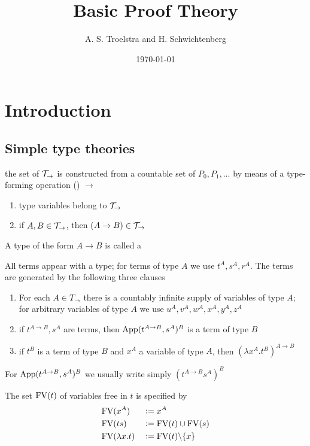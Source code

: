 \documentclass[11pt]{article}
\author{A. S. Troelstra and H. Schwichtenberg}
\date{\today}
\title{Basic Proof Theory}
\begin{document}
\maketitle
\tableofcontents \clearpage
\section{Introduction}
\label{sec:org732dd42}
\subsection{Simple type theories}
\label{sec:org7cf9ff4}
\begin{definition}
the set of  \(\mathcal{T}_\to\) is constructed from a countable set
of  \(P_0,P_1,\dots\) by means of a type-forming operation
() \(\to\)
\begin{enumerate}
\item type variables belong to \(\mathcal{T}_\to\)
\item if \(A,B\in\mathcal{T}_\to\), then \((A\to B)\in\mathcal{T}_\rightarrow\)
\end{enumerate}


A type of the form \(A\to B\) is called a 
\end{definition}

\begin{definition}
All terms appear with a type; for terms of type \(A\) we use \(t^A,s^A,r^A\). The
terms are generated by the following three clauses
\begin{enumerate}
\item For each \(A\in T_\to\) there is a countably infinite supply of variables of
type \(A\); for arbitrary variables of type \(A\) we use
\(u^A,v^A,w^A,x^A,y^A,z^A\)
\item if \(t^{A\to B},s^A\) are terms, then \(\text{App}(t^{A\to B},s^A)^B\) is a term of
type \(B\)
\item if \(t^B\) is a term of type \(B\) and \(x^A\) a variable of type \(A\), then
\((\lambda x^A.t^B)^{A\to B}\)
\end{enumerate}
\end{definition}
For \(\text{App}(t^{A\to B},s^A)^B\) we usually write simply \((t^{A\to B}s^A)^B\)
\begin{definition}[]
The set \(\text{FV}(t)\) of variables free in \(t\) is specified by
\begin{alignat*}{2}
&\text{FV}(x^A)&&:=x^A\\
&\text{FV}(ts)&&:=\text{FV}(t)\cup\text{FV}(s)\\
&\text{FV}(\lambda x.t)&&:=\text{FV}(t)\backslash\{x\}
\end{alignat*}
\end{definition}
\end{document}
